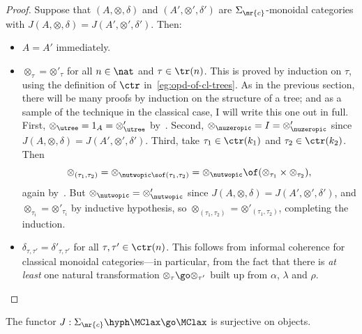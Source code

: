 \begin{proof}
Suppose that $(A, \otimes, \delta)$ and $(A', \otimes', \delta')$ are
$\Sigma_\mr{c}$-monoidal categories with $J(A, \otimes, \delta) = J(A',
\otimes', \delta')$.  Then:
%
\begin{itemize}
\item $A = A'$ immediately.
\item $\otimes_\tau = \otimes'_\tau$ for all $n\in\nat$ and
$\tau\in\tr(n)$.  This is proved by induction on $\tau$, using the
definition of $\ctr$ in~\ref{eg:opd-of-cl-trees}.  As in the previous
section, there will be many proofs by induction on the structure of a tree;
and as a sample of the technique in the classical case, I will write this
one out in full.  First, $\otimes_\utree = 1_A = \otimes'_\utree$
by~.  Second, $\otimes_\nuzeropic = I = \otimes'_\nuzeropic$
since $J(A, \otimes, \delta) = J(A', \otimes', \delta')$.  Third, take
$\tau_1 \in \ctr(k_1)$ and $\tau_2 \in \ctr(k_2)$.  Then
\[
\otimes_{(\tau_1, \tau_2)} 
= \otimes_{\nutwopic \sof (\tau_1, \tau_2)}
= \otimes_\nutwopic \of (\otimes_{\tau_1} \times \otimes_{\tau_2}),
\]
again by~.  But $\otimes_\nutwopic = \otimes'_\nutwopic$ since
$J(A, \otimes, \delta) = J(A', \otimes', \delta')$, and $\otimes_{\tau_i} =
\otimes'_{\tau_i}$ by inductive hypothesis, so $\otimes_{(\tau_1, \tau_2)}
= \otimes'_{(\tau_1, \tau_2)}$, completing the induction.
\item $\delta_{\tau, \tau'} = \delta'_{\tau, \tau'}$ for all $\tau, \tau'
\in \ctr(n)$.  This follows from informal coherence for classical
monoidal categories---in particular, from the fact that there is \emph{at
least} one natural transformation $\otimes_\tau \go \otimes_{\tau'}$ built
up from $\alpha$, $\lambda$ and $\rho$.  
\done
\end{itemize}
\end{proof}

\begin{lemma}
The functor $J: \Sigma_\mr{c}\hyph\MClax \go \MClax$ is surjective on
objects. 
\end{lemma}

